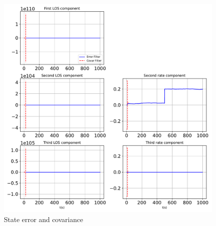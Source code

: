 \begin{figure}[htbp]\centerline{\includegraphics[height=0.9\textwidth, keepaspectratio]{AutoTeX/StatesPlotUpdate_Error}}\caption{State error and covariance}\label{fig:StatesPlotUpdate_Error}\end{figure}